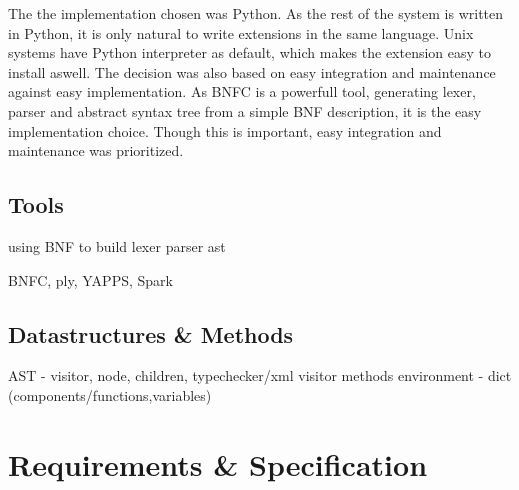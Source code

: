 The the implementation chosen was Python. As the rest of the system is
written in Python, it is only natural to write extensions in the same
language. Unix systems have Python interpreter as default, which makes
the extension easy to install aswell. The decision was also based on
easy integration and maintenance against easy implementation. As BNFC
is a powerfull tool, generating lexer, parser and abstract syntax tree
from a simple BNF description, it is the easy implementation
choice. Though this is important, easy integration and maintenance was
prioritized.


\subsection{Tools}
using BNF to build lexer parser ast

BNFC, ply, YAPPS, Spark


\subsection{Datastructures \& Methods}
AST - visitor, node, children, typechecker/xml visitor methods
environment - dict (components/functions,variables)


\section{Requirements \& Specification}

